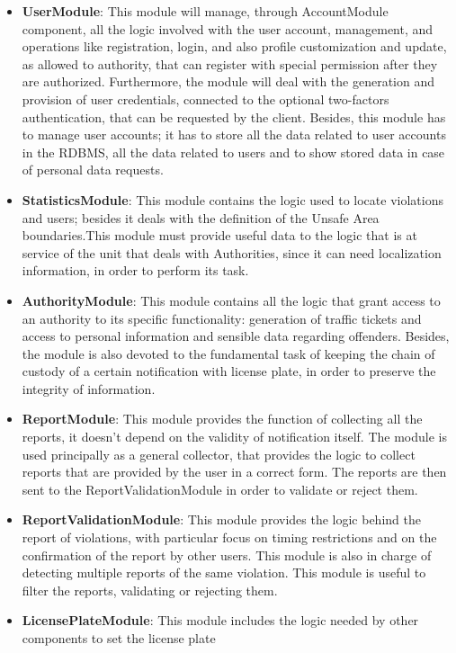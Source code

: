 \begin{itemize}
  \item \textbf{UserModule}: This module will manage, through AccountModule component, all the logic involved with 
  the user account, management, and operations like registration, login, and also profile customization and update, as 
  allowed to authority, that can register with special permission after they are authorized. Furthermore, the module 
  will deal with the generation and provision of user credentials, connected to the optional two-factors authentication, 
  that can be requested by the client. Besides, this module has to manage user accounts; it has to store all the data 
  related to user accounts in the RDBMS, all the data related to users and to show stored data in case of personal data requests.
  \item \textbf{StatisticsModule}: This module contains the logic used to locate violations and users; besides it deals with the 
  definition of the Unsafe Area boundaries.This module must provide useful data to the logic that is at service of the unit 
  that deals with  Authorities, since it can need localization information, in order to perform its task.
  \item \textbf{AuthorityModule}: This module contains all the logic that grant access to an authority to its specific functionality: 
  generation of traffic tickets and access to personal information and sensible data regarding offenders. Besides, 
  the module is also devoted to the fundamental task of keeping the chain of custody of a certain notification with 
  license plate, in order to preserve the integrity of information.
  \item \textbf{ReportModule}: This module provides the function of collecting all the reports, it doesn't depend on the validity
  of notification itself. The module is used principally as a general collector, that provides the logic to collect reports that are
  provided by the user in a correct form. The reports are then sent to the ReportValidationModule in order to validate or reject them. 
  \item \textbf{ReportValidationModule}: This module provides the logic behind the report of violations, with particular 
  focus on timing restrictions and on the confirmation of the report by other users. This module is also in charge 
  of detecting multiple reports of the same violation. This module is useful to filter the reports, validating or rejecting them.
  \item \textbf{LicensePlateModule}: This module includes the logic needed by other components to set the license plate 

\end{itemize}
